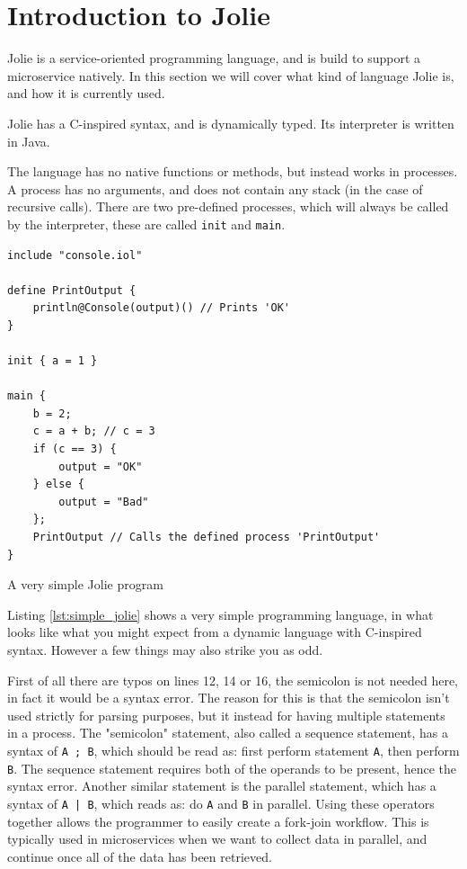 
\section{Introduction to Jolie}

Jolie is a service-oriented programming language, and is build to support a
microservice natively. In this section we will cover what kind of language
Jolie is, and how it is currently used.

Jolie has a C-inspired syntax, and is dynamically typed. Its interpreter is
written in Java.

The language has no native functions or methods, but instead works in
processes. A process has no arguments, and does not contain any stack (in the
case of recursive calls). There are two pre-defined processes, which will
always be called by the interpreter, these are called \verb!init! and
\verb!main!.

\begin{listing}[H]
\begin{verbatim}
include "console.iol"

define PrintOutput {
    println@Console(output)() // Prints 'OK'
}

init { a = 1 }

main {
    b = 2;
    c = a + b; // c = 3
    if (c == 3) {
        output = "OK"
    } else {
        output = "Bad"
    };
    PrintOutput // Calls the defined process 'PrintOutput'
}
\end{verbatim}
\caption{A very simple Jolie program}
\label{lst:simple_jolie}
\end{listing}

Listing \ref{lst:simple_jolie} shows a very simple programming language, in
what looks like what you might expect from a dynamic language with C-inspired
syntax. However a few things may also strike you as odd.

First of all there are typos on lines 12, 14 or 16, the semicolon is not needed
here, in fact it would be a syntax error. The reason for this is that the
semicolon isn't used strictly for parsing purposes, but it instead for having
multiple statements in a process. The "semicolon" statement, also called a
sequence statement, has a syntax of \verb!A ; B!, which should be read as:
first perform statement \verb!A!, then perform \verb!B!. The sequence
statement requires both of the operands to be present, hence the syntax error.
Another similar statement is the parallel statement, which has a syntax of
\verb!A | B!, which reads as: do \verb!A! and \verb!B! in parallel. Using
these operators together allows the programmer to easily create a fork-join
workflow. This is typically used in microservices when we want to collect
data in parallel, and continue once all of the data has been retrieved.

